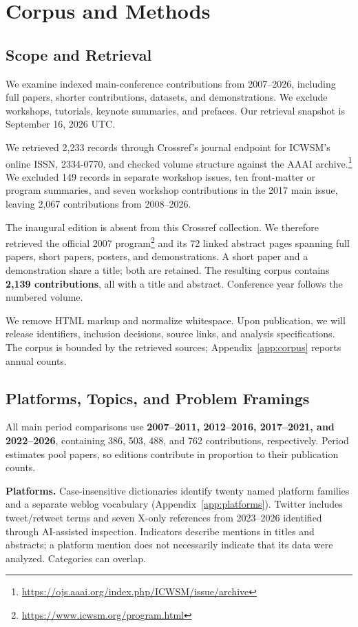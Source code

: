 \section{Corpus and Methods}
\subsection{Scope and Retrieval}
We examine indexed main-conference contributions from 2007--2026, including full papers, shorter contributions, datasets, and demonstrations. We exclude workshops, tutorials, keynote summaries, and prefaces. Our retrieval snapshot is September 16, 2026 UTC.

We retrieved 2,233 records through Crossref's journal endpoint for ICWSM's online ISSN, 2334-0770, and checked volume structure against the AAAI archive.\footnote{\url{https://ojs.aaai.org/index.php/ICWSM/issue/archive}} We excluded 149 records in separate workshop issues, ten front-matter or program summaries, and seven workshop contributions in the 2017 main issue, leaving 2,067 contributions from 2008--2026.

The inaugural edition is absent from this Crossref collection. We therefore retrieved the official 2007 program\footnote{\url{https://www.icwsm.org/program.html}} and its 72 linked abstract pages spanning full papers, short papers, posters, and demonstrations. A short paper and a demonstration share a title; both are retained. The resulting corpus contains \textbf{2,139 contributions}, all with a title and abstract. Conference year follows the numbered volume.

We remove HTML markup and normalize whitespace. Upon publication, we will release identifiers, inclusion decisions, source links, and analysis specifications. The corpus is bounded by the retrieved sources; Appendix~\ref{app:corpus} reports annual counts.

\subsection{Platforms, Topics, and Problem Framings}
All main period comparisons use \textbf{2007--2011, 2012--2016, 2017--2021, and 2022--2026}, containing 386, 503, 488, and 762 contributions, respectively. Period estimates pool papers, so editions contribute in proportion to their publication counts.

\textbf{Platforms.} Case-insensitive dictionaries identify twenty named platform families and a separate weblog vocabulary (Appendix~\ref{app:platforms}). Twitter includes tweet/retweet terms and seven X-only references from 2023--2026 identified through AI-assisted inspection. Indicators describe mentions in titles and abstracts; a platform mention does not necessarily indicate that its data were analyzed. Categories can overlap.

